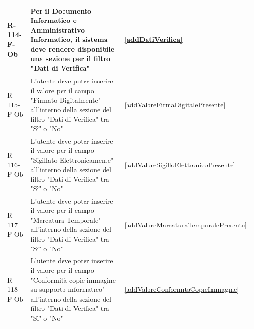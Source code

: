 \begin{longtable}{|p{2.5cm}|p{9.5cm}|p{2.5cm}|}
R-114-F-Ob & Per il Documento Informatico e Amministrativo Informatico, il sistema deve rendere disponibile una sezione per il filtro "Dati di Verifica" & \ref{addDatiVerifica} \\
\hline
R-115-F-Ob & L'utente deve poter inserire il valore per il campo "Firmato Digitalmente" all'interno della sezione del filtro "Dati di Verifica" tra "Sì" o "No" & \ref{addValoreFirmaDigitalePresente} \\
\hline
R-116-F-Ob & L'utente deve poter inserire il valore per il campo "Sigillato Elettronicamente" all'interno della sezione del filtro "Dati di Verifica" tra "Sì" o "No" & \ref{addValoreSigilloElettronicoPresente} \\
\hline
R-117-F-Ob & L'utente deve poter inserire il valore per il campo "Marcatura Temporale" all'interno della sezione del filtro "Dati di Verifica" tra "Sì" o "No" & \ref{addValoreMarcaturaTemporalePresente} \\
\hline
R-118-F-Ob & L'utente deve poter inserire il valore per il campo "Conformità copie immagine su supporto informatico" all'interno della sezione del filtro "Dati di Verifica" tra "Sì" o "No" & \ref{addValoreConformitaCopieImmagine} \\
\hline



\end{longtable}
